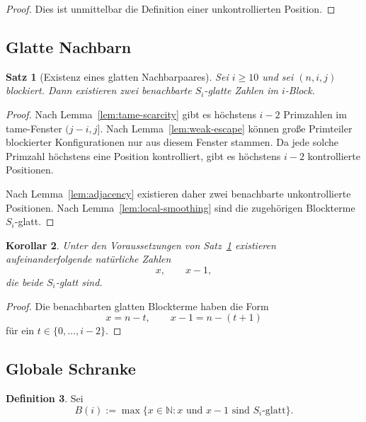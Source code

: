 \documentclass[12pt,a4paper]{article}
\theoremstyle{plain}
\newtheorem{theorem}{Satz}[section]
\newtheorem{corollary}[theorem]{Korollar}
\theoremstyle{definition}
\newtheorem{definition}[theorem]{Definition}
\theoremstyle{remark}
\begin{document}
	\begin{proof}
		Dies ist unmittelbar die Definition einer unkontrollierten Position.
	\end{proof}
	
	\subsection{Glatte Nachbarn}
	
	\begin{theorem}[Existenz eines glatten Nachbarpaares]
		\label{thm:smooth-pair}
		Sei \(i\ge10\) und sei \((n,i,j)\) blockiert. Dann existieren zwei benachbarte \(S_i\)-glatte Zahlen im \(i\)-Block.
	\end{theorem}
	
	\begin{proof}
		Nach Lemma~\ref{lem:tame-scarcity} gibt es höchstens \(i-2\) Primzahlen im tame-Fenster \((j-i,j]\). Nach Lemma~\ref{lem:weak-escape} können große Primteiler blockierter Konfigurationen nur aus diesem Fenster stammen. Da jede solche Primzahl höchstens eine Position kontrolliert, gibt es höchstens \(i-2\) kontrollierte Positionen.
		
		Nach Lemma~\ref{lem:adjacency} existieren daher zwei benachbarte unkontrollierte Positionen. Nach Lemma~\ref{lem:local-smoothing} sind die zugehörigen Blockterme \(S_i\)-glatt.
	\end{proof}
	
	\begin{corollary}
		\label{cor:xy}
		Unter den Voraussetzungen von Satz~\ref{thm:smooth-pair} existieren aufeinanderfolgende natürliche Zahlen
		\[
		x,\qquad x-1,
		\]
		die beide \(S_i\)-glatt sind.
	\end{corollary}
	
	\begin{proof}
		Die benachbarten glatten Blockterme haben die Form
		\[
		x=n-t,\qquad x-1=n-(t+1)
		\]
		für ein \(t\in\{0,\dots,i-2\}\).
	\end{proof}
	
	\subsection{Globale Schranke}
	
	\begin{definition}
		Sei
		\[
		B(i):=\max\{x\in\mathbb N : x \text{ und } x-1 \text{ sind } S_i\text{-glatt}\}.
		\]
	\end{definition}
	
\end{document}

